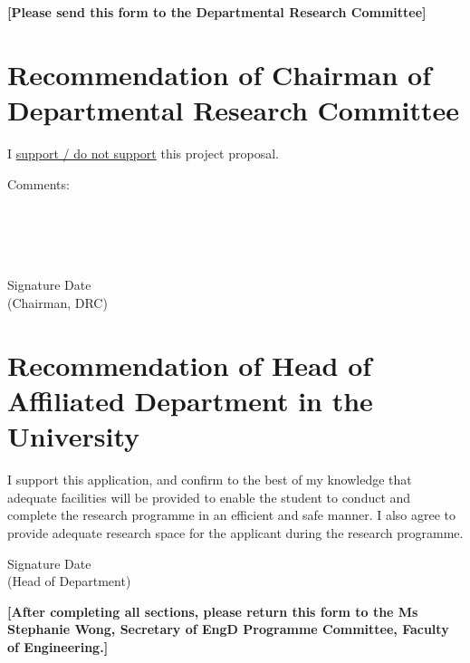 \documentclass[
  11pt,
  a4paper,
  oneside
]{article}
\begin{document}
\textbf{\normalsize[Please send this form to the Departmental Research Committee]}\\

\vspace{4ex}

\section{Recommendation of Chairman of Departmental Research Committee}

\vspace{5ex}

I \uline{support \slash{} do not support}  this project proposal.\\

\vspace{2ex}

Comments:
\uline{\phantom{x}\hfill}\\
\uline{\phantom{x}\hfill}\\
\uline{\phantom{x}\hfill}\\
\uline{\phantom{x}\hfill}\\
\uline{\phantom{x}\hfill}\\

\vspace{8ex}

Signature \uline{\hfill}  Date \uline{\phantom{xxxxxxxxxxxxxxxxxxxxxxxxxxxxxxxxxx}}\\
\phantom{xxxxxxxxxxxxxxxxxxxxxxxxx}(Chairman, DRC)\\

\vspace{5ex}

\section{Recommendation of Head of Affiliated Department in the University}

\vspace{5ex}

I support this application, and confirm to the best of my knowledge that adequate facilities will be provided to enable the student to conduct and complete the research programme in an efficient and safe manner. I also agree to provide adequate research space for the applicant during the research programme.

\vspace{8ex}

Signature \uline{\hfill}  Date \uline{\phantom{xxxxxxxxxxxxxxxxxxxxxxxxxxxxxxxxxx}}\\
\phantom{xxxxxxxxxxxxxxxxxxxxxx}(Head of Department)\\

\vfill

\textbf{\normalsize[After completing all sections, please return this form to the Ms Stephanie Wong, Secretary of EngD Programme Committee, Faculty of Engineering.]}
\end{document}
